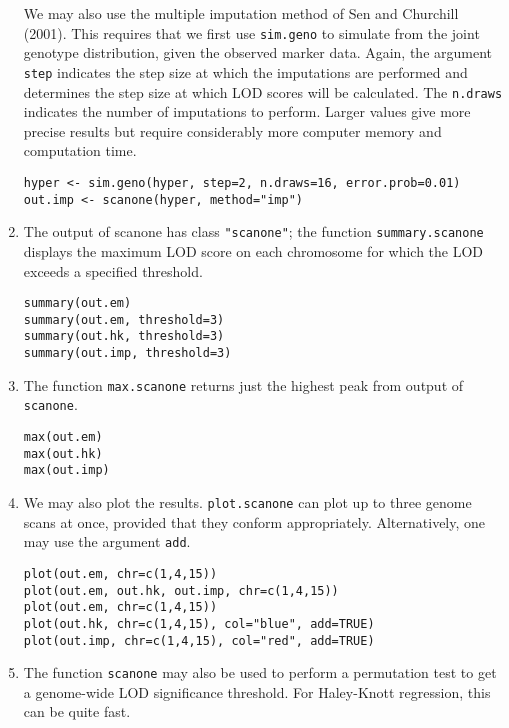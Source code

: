 \documentclass[10pt,letterpaper]{article}
\newcommand{\usercolor}{\color [named]{BlueViolet}}
\begin{document}
\begin{enumerate}
We may also use the multiple imputation method of Sen and Churchill
(2001).  This requires that we first use \verb-sim.geno- to simulate
from the joint genotype distribution, given the observed marker data.  
Again, the argument \verb-step- indicates the step size at which the
imputations are performed and determines the step size at which LOD
scores will be calculated.  The \verb-n.draws- indicates the number of
imputations to perform.  Larger values give more precise results but
require considerably more computer memory and computation time.

\usercolor
\verb|hyper <- sim.geno(hyper, step=2, n.draws=16, error.prob=0.01)| \\
\verb|out.imp <- scanone(hyper, method="imp")|
\normalcolor

\item The output of scanone has class
  \verb-"scanone"-; the function \verb-summary.scanone- displays the
  maximum LOD score on each chromosome for which the LOD exceeds a
  specified threshold.

\usercolor
\verb|summary(out.em)| \\
\verb|summary(out.em, threshold=3)| \\
\verb|summary(out.hk, threshold=3)| \\
\verb|summary(out.imp, threshold=3)| 
\normalcolor

\item The function \verb-max.scanone- returns just the highest peak
from output of \verb-scanone-.

\usercolor
\verb|max(out.em)| \\
\verb|max(out.hk)| \\
\verb|max(out.imp)| 
\normalcolor

\item We may also plot the results.  \verb-plot.scanone- can plot up
to three genome scans at once, provided that they conform
appropriately.  Alternatively, one may use the argument \verb-add-.

\usercolor
\verb|plot(out.em, chr=c(1,4,15))| \\
\verb|plot(out.em, out.hk, out.imp, chr=c(1,4,15))|  \\
\verb|plot(out.em, chr=c(1,4,15))| \\
\verb|plot(out.hk, chr=c(1,4,15), col="blue", add=TRUE)| \\
\verb|plot(out.imp, chr=c(1,4,15), col="red", add=TRUE)|
\normalcolor

\item The function \verb-scanone- may also be used to perform a
permutation test to get a genome-wide LOD significance threshold.
For Haley-Knott regression, this can be quite fast.


\end{enumerate}
\end{document}
